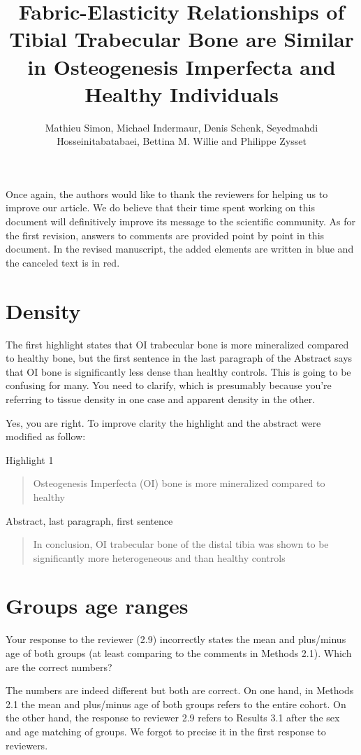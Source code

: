 \documentclass{AR2RC}
\title{Fabric-Elasticity Relationships of Tibial Trabecular Bone are Similar in Osteogenesis Imperfecta and Healthy Individuals}
\author{Mathieu Simon, Michael Indermaur, Denis Schenk, Seyedmahdi Hosseinitabatabaei, Bettina	M. Willie and Philippe Zysset}
\begin{document}
\maketitle

\vspace{1em}Once again, the authors would like to thank the reviewers for helping us to improve our article. We do believe that their time spent working on this document will definitively improve its message to the scientific community. As for the first revision, answers to comments are provided point by point in this document. In the revised manuscript, the added elements are written in blue and the canceled text is in red.

\section{Density}
\RC The first highlight states that OI trabecular bone is more mineralized compared to healthy bone, but the first sentence in the last paragraph of the Abstract says that OI bone is significantly less dense than healthy controls. This is going to be confusing for many. You need to clarify, which is presumably because you’re referring to tissue density in one case and apparent density in the other.

\AR Yes, you are right. To improve clarity the highlight and the abstract were modified as follow:

Highlight 1
\begin{quote}
	Osteogenesis Imperfecta (OI)  bone  is more mineralized compared to healthy
\end{quote} 

Abstract, last paragraph, first sentence
\begin{quote}
	In conclusion, OI trabecular bone of the distal tibia was shown to be significantly more heterogeneous and   than healthy controls
\end{quote} 

\section{Groups age ranges}
\RC Your response to the reviewer (2.9) incorrectly states the mean and plus/minus age of both groups (at least comparing to the comments in Methods 2.1). Which are the correct numbers?

\AR The numbers are indeed different but both are correct. On one hand, in Methods 2.1 the mean and plus/minus age of both groups refers to the entire cohort. On the other hand, the response to reviewer 2.9 refers to Results 3.1 after the sex and age matching of groups. We forgot to precise it in the first response to reviewers.
\end{document}
